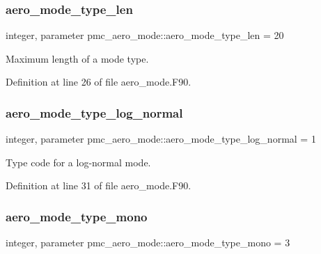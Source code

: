 \subsubsection{\texorpdfstring{aero\+\_\+mode\+\_\+type\+\_\+len}{aero\_mode\_type\_len}}
{\footnotesize\ttfamily integer, parameter pmc\+\_\+aero\+\_\+mode\+::aero\+\_\+mode\+\_\+type\+\_\+len = 20}



Maximum length of a mode type. 



Definition at line 26 of file aero\+\_\+mode.\+F90.

\mbox{\label{namespacepmc__aero__mode_a936200d0b3116d7e58d32e7b43ac4789}} 
\subsubsection{\texorpdfstring{aero\+\_\+mode\+\_\+type\+\_\+log\+\_\+normal}{aero\_mode\_type\_log\_normal}}
{\footnotesize\ttfamily integer, parameter pmc\+\_\+aero\+\_\+mode\+::aero\+\_\+mode\+\_\+type\+\_\+log\+\_\+normal = 1}



Type code for a log-\/normal mode. 



Definition at line 31 of file aero\+\_\+mode.\+F90.

\mbox{\label{namespacepmc__aero__mode_a2a5e08b4bbed0947335c38a0a3791f6c}} 
\subsubsection{\texorpdfstring{aero\+\_\+mode\+\_\+type\+\_\+mono}{aero\_mode\_type\_mono}}
{\footnotesize\ttfamily integer, parameter pmc\+\_\+aero\+\_\+mode\+::aero\+\_\+mode\+\_\+type\+\_\+mono = 3}



